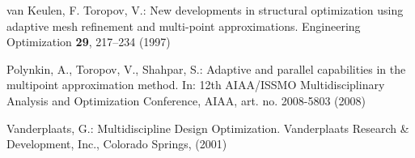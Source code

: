 \documentclass[runningheads,a4paper]{llncs}
\begin{document}
\begin{thebibliography}{10}
van Keulen, F. Toropov, V.:
\newblock New developments in structural optimization using adaptive mesh refinement and multi-point approximations.
\newblock Engineering Optimization \textbf{29}, 217--234 (1997)

Polynkin, A., Toropov, V., Shahpar, S.:
\newblock Adaptive and parallel capabilities in the multipoint approximation  method.
\newblock In: 12th AIAA/ISSMO Multidisciplinary Analysis and Optimization Conference, AIAA, art. no. 2008-5803 (2008)

Vanderplaats, G.:
\newblock Multidiscipline Design Optimization. 
\newblock Vanderplaats Research \& Development, Inc., Colorado Springs, (2001)

\end{thebibliography}



%
%
%
%
%
%
%
%
%

\end{document}
